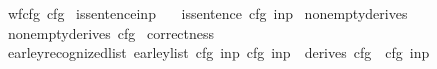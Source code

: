 \begin{isabellebody}
\ \ \ {\isachardoublequoteopen}wf{\isacharunderscore}{\kern0pt}cfg\ cfg{\isachardoublequoteclose}%
\isadelimproof
%
\endisadelimproof
%
\isatagproof
%
\endisatagproof
{\isafoldproof}%
%
\isadelimproof
\isanewline
%
\endisadelimproof
{}\isamarkupfalse%
\ is{\isacharunderscore}{\kern0pt}sentence{\isacharunderscore}{\kern0pt}inp{\isacharcolon}{\kern0pt}\isanewline
\ \ \ {\isachardoublequoteopen}is{\isacharunderscore}{\kern0pt}sentence\ cfg\ inp{\isachardoublequoteclose}%
\isadelimproof
%
\endisadelimproof
%
\isatagproof
%
\endisatagproof
{\isafoldproof}%
%
\isadelimproof
\isanewline
%
\endisadelimproof
{}\isamarkupfalse%
\ nonempty{\isacharunderscore}{\kern0pt}derives{\isacharcolon}{\kern0pt}\isanewline
\ \ \ {\isachardoublequoteopen}nonempty{\isacharunderscore}{\kern0pt}derives\ cfg{\isachardoublequoteclose}%
\isadelimproof
%
\endisadelimproof
%
\isatagproof
%
\endisatagproof
{\isafoldproof}%
%
\isadelimproof
\isanewline
%
\endisadelimproof
{}\isamarkupfalse%
\ correctness{\isacharcolon}{\kern0pt}\isanewline
\ \ \ {\isachardoublequoteopen}earley{\isacharunderscore}{\kern0pt}recognized{\isacharunderscore}{\kern0pt}list\ {\isacharparenleft}{\kern0pt}earley{\isacharunderscore}{\kern0pt}list\ cfg\ inp{\isacharparenright}{\kern0pt}\ cfg\ inp\ {\isasymlongleftrightarrow}\ derives\ cfg\ {\isacharbrackleft}{\kern0pt}{\isasymSS}\ cfg{\isacharbrackright}{\kern0pt}\ inp{\isachardoublequoteclose}%
\isadelimproof
%
\endisadelimproof
%
\isatagproof
%
\endisatagproof
{\isafoldproof}%
%
\isadelimproof
%
\endisadelimproof
%
\isadelimtheory
%
\endisadelimtheory
%
\isatagtheory
%
\endisatagtheory
{\isafoldtheory}%
%
\isadelimtheory
%
\endisadelimtheory
%
\end{isabellebody}%
\endinput
